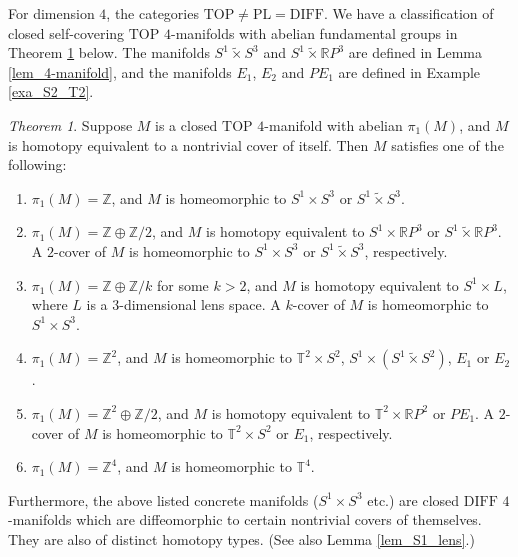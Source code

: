 \documentclass[12pt]{amsart}
\theoremstyle{plain}
\theoremstyle{definition}
\theoremstyle{question}
\theoremstyle{remark}
\theoremstyle{assumption}
\numberwithin{equation}{section}
\theoremstyle{bigthm}
\newtheorem{bigthm}{Theorem}
\begin{document}
For dimension $4$, the categories $\mathrm{TOP} \ne \mathrm{PL} = \mathrm{DIFF}$. We have a classification of closed self-covering $\mathrm{TOP}$ $4$-manifolds with abelian fundamental groups in Theorem \ref{thm_4-manifold} below. The manifolds $S^{1} \tilde{\times} S^{3}$ and $S^{1} \tilde{\times} \mathbb{R}P^{3}$ are defined in Lemma \ref{lem_4-manifold}, and the manifolds $E_{1}$, $E_{2}$ and $PE_{1}$ are defined in Example \ref{exa_S2_T2}.
\begin{bigthm}\label{thm_4-manifold}
Suppose $M$ is a closed $\mathrm{TOP}$ $4$-manifold with abelian $\pi_{1} (M)$, and $M$ is homotopy equivalent to a nontrivial cover of itself. Then $M$ satisfies one of the following:
\begin{enumerate}
\item $\pi_{1} (M) = \mathbb{Z}$, and $M$ is homeomorphic to $S^{1} \times S^{3}$ or $S^{1} \tilde{\times} S^{3}$.

\item $\pi_{1} (M) = \mathbb{Z} \oplus \mathbb{Z} /2$, and $M$ is homotopy equivalent to $S^{1} \times \mathbb{R}P^{3}$ or $S^{1} \tilde{\times} \mathbb{R}P^{3}$. A $2$-cover of $M$ is homeomorphic to $S^{1} \times S^{3}$ or $S^{1} \tilde{\times} S^{3}$, respectively.

\item $\pi_{1} (M) = \mathbb{Z} \oplus \mathbb{Z} /k$ for some $k>2$, and $M$ is homotopy equivalent to $S^{1} \times L$, where $L$ is a $3$-dimensional lens space. A $k$-cover of $M$ is homeomorphic to $S^{1} \times S^{3}$.

\item $\pi_{1} (M) = \mathbb{Z}^{2}$, and $M$ is homeomorphic to $\mathbb{T}^{2} \times S^{2}$, $S^{1} \times (S^{1} \tilde{\times} S^{2})$, $E_{1}$ or $E_{2}$.

\item $\pi_{1} (M) = \mathbb{Z}^{2} \oplus \mathbb{Z}/2$, and $M$ is homotopy equivalent to $\mathbb{T}^{2} \times \mathbb{R} P^{2}$ or $PE_{1}$. A $2$-cover of $M$ is homeomorphic to $\mathbb{T}^{2} \times S^{2}$ or $E_{1}$, respectively.

\item $\pi_{1} (M) = \mathbb{Z}^{4}$, and $M$ is homeomorphic to $\mathbb{T}^{4}$.
\end{enumerate}

Furthermore, the above listed concrete manifolds ($S^{1} \times S^{3}$ etc.) are closed $\mathrm{DIFF}$ $4$-manifolds which are diffeomorphic to certain nontrivial covers of themselves. They are also of distinct homotopy types. (See also Lemma \ref{lem_S1_lens}.)
\end{bigthm}
\end{document}
